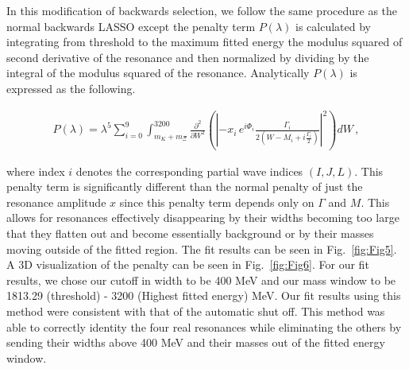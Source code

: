 \documentclass[aps, prd, twocolumn, showpacs, superscriptaddress,
preprintnumbers, nofootinbib]{revtex4-1}
\begin{document}
In this modification of backwards selection, we follow the same procedure as the normal backwards LASSO except the penalty term $P(\lambda)$ is calculated by integrating from threshold to the maximum fitted energy the modulus squared of second derivative of the resonance and then normalized by dividing by the integral of the modulus squared of the resonance. Analytically $P(\lambda)$ is expressed as the following.
\begin{widetext}
\begin{eqnarray}
P(\lambda)= \lambda^5\sum_{i=0}^{\text{9}} \int_{m_K+m_{\Xi}}^{3200} \frac{\partial^2}{\partial W^2} \left( | -x_i\,e^{i\Phi_i} \frac{\Gamma_i}{2(W-M_i+i \frac{\Gamma_i}{2})}|^2 \right) dW\,,
\end{eqnarray}
\end{widetext}
where index $i$ denotes the corresponding partial wave indices $(I,J,L)$. 
This penalty term is significantly different than the normal penalty of just the resonance amplitude $x$ since this penalty term depends only on $\Gamma$ and $M$. This allows for resonances effectively disappearing by their widths becoming too large that they flatten out and become essentially background or by their masses moving outside of the fitted region. The fit results can be seen in Fig.~\ref{fig:Fig5}. A 3D visualization of the penalty can be seen in  Fig.~\ref{fig:Fig6}. For our fit results, we chose our cutoff in width to be 400 MeV and our mass window to be 1813.29 (threshold) - 3200 (Highest fitted energy) MeV. Our fit results using this method were consistent with that of the automatic shut off. This method was able to correctly identity the four real resonances while eliminating the others by sending their widths above 400 MeV and their masses out of the fitted energy window.
\end{document}
